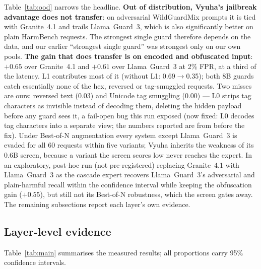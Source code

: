 \documentclass[11pt]{article}
\begin{document}
Table~\ref{tab:ood} narrows the headline. \textbf{Out of distribution, Vyuha's jailbreak advantage does not
transfer}: on adversarial WildGuardMix prompts it is tied with Granite~4.1 and trails Llama~Guard~3, which
is also significantly better on plain HarmBench requests. The strongest single guard therefore depends on
the data, and our earlier ``strongest single guard'' was strongest only on our own pools.
\textbf{The gain that does transfer is on encoded and obfuscated input}: $+0.65$ over Granite~4.1 and
$+0.61$ over Llama~Guard~3 at 2\% FPR, at a third of the latency. L1 contributes most of it (without L1:
0.69$\rightarrow$0.35); both 8B guards catch essentially none of the hex, reversed or tag-smuggled
requests. Two misses are ours: reversed text (0.03) and Unicode tag smuggling (0.00) --- L0 strips tag
characters as invisible instead of decoding them, deleting the hidden payload before any guard sees it, a
fail-open bug this run exposed (now fixed: L0 decodes tag characters into a separate view; the numbers
reported are from before the fix). Under Best-of-N augmentation every system except Llama~Guard~3 is evaded
for all 60 requests within five variants; Vyuha inherits the weakness of its 0.6B screen, because a variant
the screen scores low never reaches the expert. In an exploratory, post-hoc run (not pre-registered)
replacing Granite~4.1 with Llama~Guard~3 as the cascade expert recovers Llama~Guard~3's adversarial and
plain-harmful recall within the confidence interval while keeping the obfuscation gain ($+0.55$), but
still not its Best-of-N robustness, which the screen gates away. The remaining subsections report each
layer's own evidence.

\subsection{Layer-level evidence}
Table~\ref{tab:main} summarises the measured results; all proportions carry 95\% confidence intervals.
\end{document}
